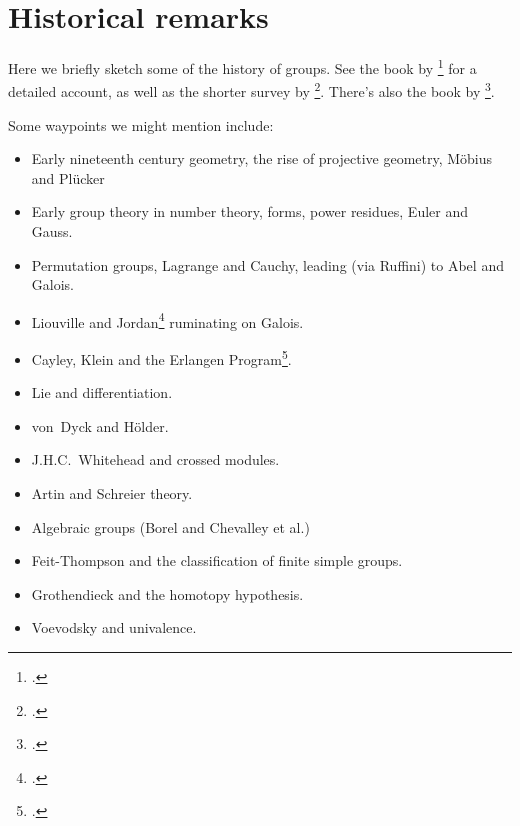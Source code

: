 \chapter{Historical remarks}
\label{ch:grouphistory}

Here we briefly sketch some of the history of groups.
See the book by \citeauthor{Wussing-genesis}\footcite{Wussing-genesis}
for a detailed account,
as well as the shorter survey by
\citeauthor{Kleiner-group-survey}\footcite{Kleiner-group-survey}.
There's also the book by \citeauthor{Yaglom1988}\footcite{Yaglom1988}.

Some waypoints we might mention include:
\begin{itemize}
\item Early nineteenth century geometry,
  the rise of projective geometry, Möbius and Plücker
\item Early group theory in number theory,
  forms, power residues, Euler and Gauss.
\item Permutation groups, Lagrange and Cauchy,
  leading (via Ruffini) to Abel and Galois.
\item Liouville and Jordan\footcite{Jordan} ruminating on Galois.
\item Cayley, Klein and the Erlangen Program\footcite{Klein-EP-de}.
\item Lie and differentiation.
\item von~Dyck and Hölder.
\item J.H.C.~Whitehead and crossed modules.
\item Artin and Schreier theory.
\item Algebraic groups (Borel and Chevalley et al.)
\item Feit-Thompson and the classification of finite simple groups.
\item Grothendieck and the homotopy hypothesis.
\item Voevodsky and univalence.
\end{itemize}

